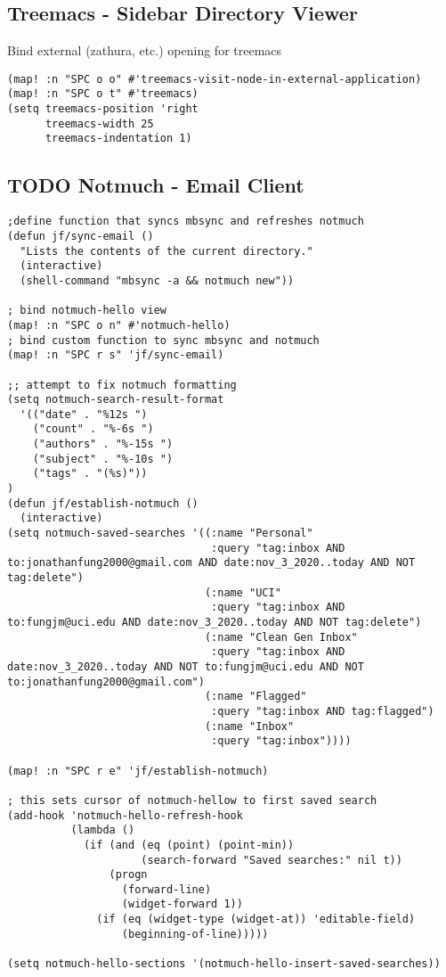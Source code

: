 \documentclass[8pt]{article}
\begin{document}
\subsection{Treemacs - Sidebar Directory Viewer}
\label{sec:orga38a552}
Bind external (zathura, etc.) opening for treemacs
\begin{verbatim}
(map! :n "SPC o o" #'treemacs-visit-node-in-external-application)
(map! :n "SPC o t" #'treemacs)
(setq treemacs-position 'right
      treemacs-width 25
      treemacs-indentation 1)
\end{verbatim}
\subsection{{\bfseries\sffamily TODO} Notmuch - Email Client}
\label{sec:org5e6d9e1}
\begin{verbatim}
;define function that syncs mbsync and refreshes notmuch
(defun jf/sync-email ()
  "Lists the contents of the current directory."
  (interactive)
  (shell-command "mbsync -a && notmuch new"))

; bind notmuch-hello view
(map! :n "SPC o n" #'notmuch-hello)
; bind custom function to sync mbsync and notmuch
(map! :n "SPC r s" 'jf/sync-email)

;; attempt to fix notmuch formatting
(setq notmuch-search-result-format
  '(("date" . "%12s ")
    ("count" . "%-6s ")
    ("authors" . "%-15s ")
    ("subject" . "%-10s ")
    ("tags" . "(%s)"))
)
(defun jf/establish-notmuch ()
  (interactive)
(setq notmuch-saved-searches '((:name "Personal"
                                :query "tag:inbox AND to:jonathanfung2000@gmail.com AND date:nov_3_2020..today AND NOT tag:delete")
                               (:name "UCI"
                                :query "tag:inbox AND to:fungjm@uci.edu AND date:nov_3_2020..today AND NOT tag:delete")
                               (:name "Clean Gen Inbox"
                                :query "tag:inbox AND date:nov_3_2020..today AND NOT to:fungjm@uci.edu AND NOT to:jonathanfung2000@gmail.com")
                               (:name "Flagged"
                                :query "tag:inbox AND tag:flagged")
                               (:name "Inbox"
                                :query "tag:inbox"))))

(map! :n "SPC r e" 'jf/establish-notmuch)

; this sets cursor of notmuch-hellow to first saved search
(add-hook 'notmuch-hello-refresh-hook
          (lambda ()
            (if (and (eq (point) (point-min))
                     (search-forward "Saved searches:" nil t))
                (progn
                  (forward-line)
                  (widget-forward 1))
              (if (eq (widget-type (widget-at)) 'editable-field)
                  (beginning-of-line)))))

(setq notmuch-hello-sections '(notmuch-hello-insert-saved-searches))
\end{verbatim}
\end{document}
